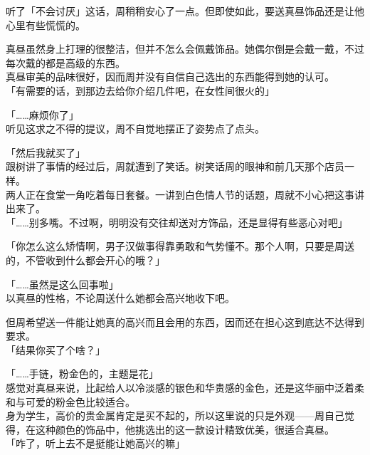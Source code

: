 听了「不会讨厌」这话，周稍稍安心了一点。但即使如此，要送真昼饰品还是让他心里有些慌慌的。

真昼虽然身上打理的很整洁，但并不怎么会佩戴饰品。她偶尔倒是会戴一戴，不过每次戴的都是高级的东西。\\

真昼审美的品味很好，因而周并没有自信自己选出的东西能得到她的认可。\\

「有需要的话，到那边去给你介绍几件吧，在女性间很火的」

「……麻烦你了」\\

听见这求之不得的提议，周不自觉地摆正了姿势点了点头。\\%

\vspace{2\baselineskip}

「然后我就买了」\\

跟树讲了事情的经过后，周就遭到了笑话。树笑话周的眼神和前几天那个店员一样。\\

两人正在食堂一角吃着每日套餐。一讲到白色情人节的话题，周就不小心把这事讲出来了。\\

「……别多嘴。不过啊，明明没有交往却送对方饰品，还是显得有些恶心对吧」

「你怎么这么矫情啊，男子汉做事得靠勇敢和气势懂不。那个人啊，只要是周送的，不管收到什么都会开心的哦？」

「……虽然是这么回事啦」\\

以真昼的性格，不论周送什么她都会高兴地收下吧。

但周希望送一件能让她真的高兴而且会用的东西，因而还在担心这到底达不达得到要求。\\

「结果你买了个啥？」

「……手链，粉金色的，主题是花」\\

感觉对真昼来说，比起给人以冷淡感的银色和华贵感的金色，还是这华丽中泛着柔和与可爱的粉金色比较适合。\\

身为学生，高价的贵金属肯定是买不起的，所以这里说的只是外观——周自己觉得，在这种颜色的饰品中，他挑选出的这一款设计精致优美，很适合真昼。\\

「咋了，听上去不是挺能让她高兴的嘛」

